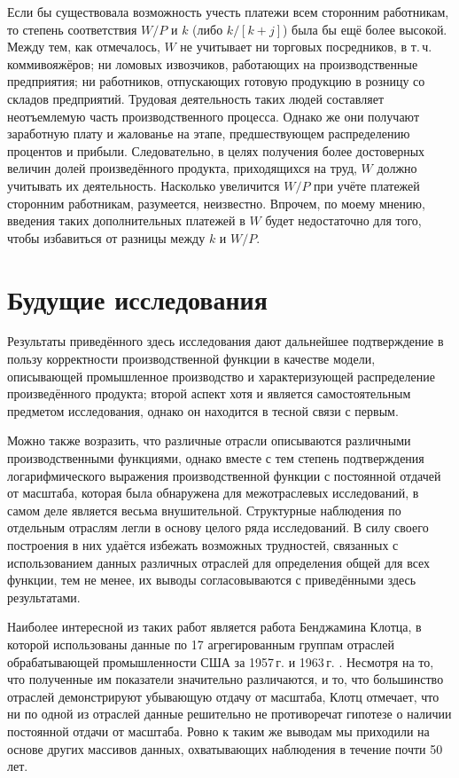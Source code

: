 \documentclass{article}
\begin{document}
Если бы существовала возможность учесть платежи всем сторонним работникам, то степень соответствия \(W/P\) и \(k\) (либо \(k/[k + j]\)) была бы ещё более высокой. Между тем, как отмечалось, \(W\) не учитывает ни торговых посредников, в т.\,ч. коммивояжёров; ни ломовых извозчиков, работающих на производственные предприятия; ни работников, отпускающих готовую продукцию в розницу со складов предприятий. Трудовая деятельность таких людей составляет неотъемлемую часть производственного процесса. Однако же они получают заработную плату и жалованье на этапе, предшествующем распределению процентов и прибыли. Следовательно, в целях получения более достоверных величин долей произведённого продукта, приходящихся на труд, \(W\) должно учитывать их деятельность. Насколько увеличится \(W/P\) при учёте платежей сторонним работникам, разумеется, неизвестно. Впрочем, по моему мнению, введения таких дополнительных платежей в \(W\) будет недостаточно для того, чтобы избавиться от разницы между \(k\) и \(W/P\).

\section*{Будущие исследования}

Результаты приведённого здесь исследования дают дальнейшее подтверждение в пользу корректности производственной функции в качестве модели, описывающей промышленное производство и характеризующей распределение произведённого продукта; второй аспект хотя и является самостоятельным предметом исследования, однако он находится в тесной связи с первым.

Можно также возразить, что различные отрасли описываются различными производственными функциями, однако вместе с тем степень подтверждения логарифмического выражения производственной функции с постоянной отдачей от масштаба, которая была обнаружена для межотраслевых исследований, в самом деле является весьма внушительной. Структурные наблюдения по отдельным отраслям легли в основу целого ряда исследований. В силу своего построения в них удаётся избежать возможных трудностей, связанных с использованием данных различных отраслей для определения общей для всех функции, тем не менее, их выводы согласовываются с приведёнными здесь результатами.


Наиболее интересной из таких работ является работа Бенджамина Клотца, в которой использованы данные по 17 агрегированным группам отраслей обрабатывающей промышленности США за 1957\,г. и 1963\,г. \cite{Klotz:1}. Несмотря на то, что полученные им показатели значительно различаются, и то, что большинство отраслей демонстрируют убывающую отдачу от масштаба, Клотц отмечает, что ни по одной из отраслей данные решительно не противоречат гипотезе о наличии постоянной отдачи от масштаба. Ровно к таким же выводам мы приходили на основе других массивов данных, охватывающих наблюдения в течение почти 50 лет.
\end{document}

